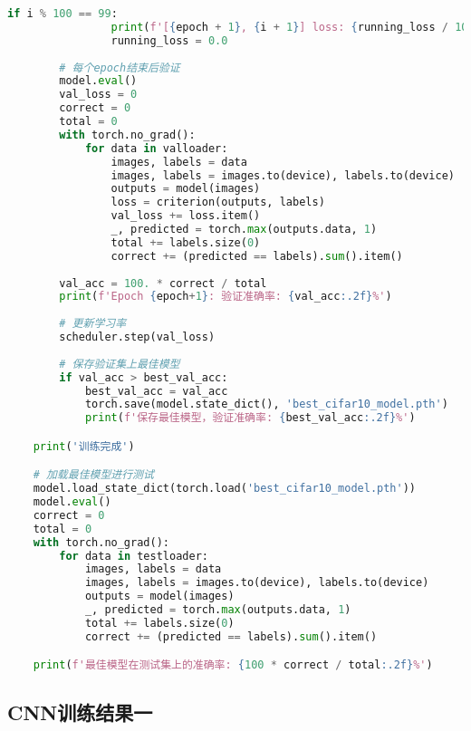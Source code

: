 \documentclass[UTF8]{report}
\theoremstyle{MyLineTheoremStyle} %
\theoremstyle{MyBlockTheoremStyle} %
\theoremstyle{MySubsubsectionStyle} %
\begin{document}
\begin{lstlisting}[language=python, caption={神经网络CNN训练（纯手写第一版）}, label={lst:cnn_train_handwritten}]
            if i % 100 == 99:
                print(f'[{epoch + 1}, {i + 1}] loss: {running_loss / 100:.3f} | acc: {100.*correct/total:.2f}%')
                running_loss = 0.0
        
        # 每个epoch结束后验证
        model.eval()
        val_loss = 0
        correct = 0
        total = 0
        with torch.no_grad():
            for data in valloader:
                images, labels = data
                images, labels = images.to(device), labels.to(device)
                outputs = model(images)
                loss = criterion(outputs, labels)
                val_loss += loss.item()
                _, predicted = torch.max(outputs.data, 1)
                total += labels.size(0)
                correct += (predicted == labels).sum().item()
        
        val_acc = 100. * correct / total
        print(f'Epoch {epoch+1}: 验证准确率: {val_acc:.2f}%')
        
        # 更新学习率
        scheduler.step(val_loss)
        
        # 保存验证集上最佳模型
        if val_acc > best_val_acc:
            best_val_acc = val_acc
            torch.save(model.state_dict(), 'best_cifar10_model.pth')
            print(f'保存最佳模型，验证准确率: {best_val_acc:.2f}%')

    print('训练完成')

    # 加载最佳模型进行测试
    model.load_state_dict(torch.load('best_cifar10_model.pth'))
    model.eval()
    correct = 0
    total = 0
    with torch.no_grad():
        for data in testloader:
            images, labels = data
            images, labels = images.to(device), labels.to(device)
            outputs = model(images)
            _, predicted = torch.max(outputs.data, 1)
            total += labels.size(0)
            correct += (predicted == labels).sum().item()

    print(f'最佳模型在测试集上的准确率: {100 * correct / total:.2f}%')
\end{lstlisting}


\subsection{CNN训练结果一}
\end{document}
